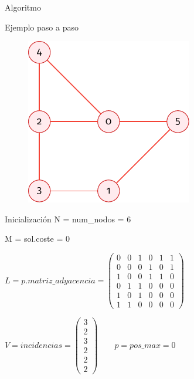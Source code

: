 \documentclass[spanish]{beamer}
\begin{document}
\begin{frame}{Algoritmo}
	
\end{frame}

\begin{frame}{Ejemplo paso a paso}
	\begin{figure}[H]
		\centering \includegraphics{./img/grafo-ejemplo-sin-recubrir.pdf}
	\end{figure}

\end{frame}

\begin{frame}{Inicialización}
	N = num\_nodos = 6

	M = sol.coste = 0


	$\displaystyle  L = p.matriz\_adyacencia =
\begin{pmatrix}
  0 & 0 & 1 & 0 & 1 & 1 \\
  0 & 0 & 0 & 1 & 0 & 1 \\
  1 & 0 & 0 & 1 & 1 & 0 \\
  0 & 1 & 1 & 0 & 0 & 0 \\
  1 & 0 & 1 & 0 & 0 & 0 \\
  1 & 1 & 0 & 0 & 0 & 0
\end{pmatrix}$

	$\displaystyle  V = incidencias =
\begin{pmatrix}
  3 \\
  2 \\
  3 \\
  2 \\
  2 \\
  2
\end{pmatrix} \hspace{2em} p = pos\_max = 0$

\end{frame}
\end{document}
